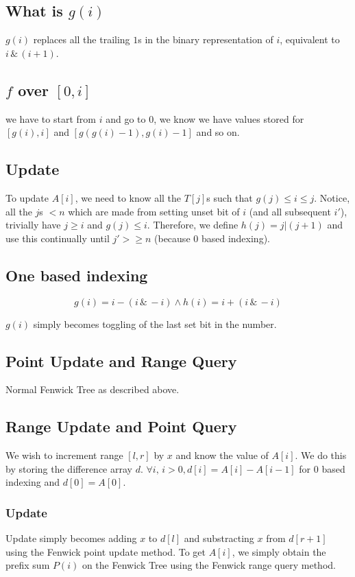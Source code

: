 \documentclass{article}
\begin{document}
	\subsection{What is $g(i)$}
	$g(i)$ replaces all the trailing $1$s in the binary representation of $i$, equivalent to $i \, \& \, (i+1)$. 
	
	\subsection{$f$ over $[0,i]$}
	we have to start from $i$ and go to $0$, we know we have values stored for $[g(i),i]$ and $[g(g(i)-1),g(i)-1]$ and so on.
	
	\subsection{Update}
	To update $A[i]$, we need to know all the $T[j]$s such that $g(j) \leq i \leq j$. Notice, all the $j$s  $< n$ which are made from setting unset bit of $i$ (and all subsequent $i'$), trivially have $j \geq i$ and $g(j) \leq i$. Therefore, we define $h(j) = j | (j+1)$ and use this continually until $j' > \geq n$ (because $0$ based indexing).
	
	\subsection{One based indexing}
	\[
	g(i) = i - (i \, \& \, -i) \land h(i) = i + (i \, \& \, -i)
	\]
	
	$g(i)$ simply becomes toggling of the last set bit in the number.
	
	\subsection{Point Update and Range Query}
	Normal Fenwick Tree as described above.
	
	\subsection{Range Update and Point Query}
	We wish to increment range $[l,r]$ by $x$ and know the value of $A[i]$. We do this by storing the difference array $d$. $\forall i, \, i > 0, d[i] = A[i]-A[i-1]$ for $0$ based indexing and $d[0] = A[0]$.
	
	\subsubsection{Update}
	Update simply becomes adding $x$ to $d[l]$ and substracting $x$ from $d[r+1]$ using the Fenwick point update method. To get $A[i]$, we simply obtain the prefix sum $P(i)$ on the Fenwick Tree using the Fenwick range query method.
	
\end{document}
